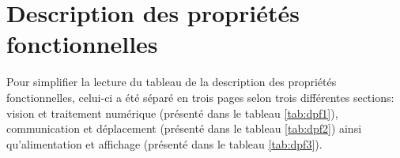 

\chapter{Description des propriétés fonctionnelles}
\label{s:fonctionnelles}
Pour simplifier la lecture du tableau de la description des propriétés fonctionnelles, celui-ci a été séparé en trois pages selon trois différentes sections: vision et traitement numérique (présenté dans le tableau \ref{tab:dpf1}), communication et déplacement (présenté dans le tableau \ref{tab:dpf2}) ainsi qu'alimentation et affichage (présenté dans le tableau \ref{tab:dpf3}). 
